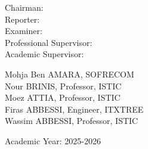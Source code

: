 \begin{titlepage}
\begin{flushleft}
        \begin{minipage}[c]{0.3\columnwidth}
            Chairman:\\
            Reporter:\\
            Examiner:\\
            Professional Supervisor:\\
            Academic Supervisor:
        \end{minipage}
        \begin{minipage}[c]{0.6\columnwidth}
            Mohja Ben AMARA, SOFRECOM\\
            Nour BRINIS, Professor, ISTIC\\
            Moez ATTIA, Professor, ISTIC\\
            Firas ABBESSI, Engineer, ITXTREE\\
            Wassim ABBESSI, Professor, ISTIC
        \end{minipage}
    \end{flushleft}

    \vskip1cm

    {\large Academic Year: 2025-2026}\\[3cm]



    \vfill %

\end{titlepage}
%